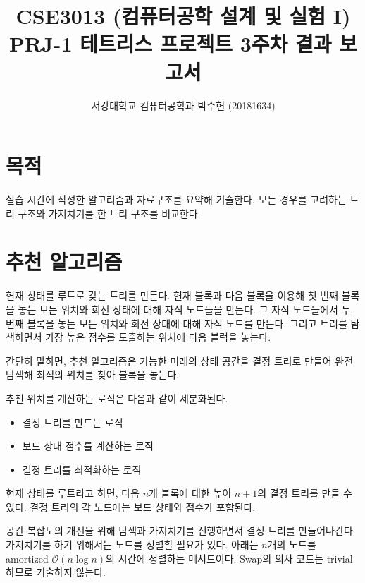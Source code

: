 
    
\usepackage{subfig}
\usepackage{pgfplots}



\title{CSE3013 (컴퓨터공학 설계 및 실험 I) \space \newline PRJ-1 테트리스 프로젝트 3주차 결과 보고서}
\author{서강대학교 컴퓨터공학과 박수현 (20181634)}
\maketitle

\section{목적}
실습 시간에 작성한 알고리즘과 자료구조를 요약해 기술한다. 모든 경우를 고려하는 트리 구조와 가지치기를 한 트리 구조를 비교한다.

\section{추천 알고리즘}
현재 상태를 루트로 갖는 트리를 만든다. 현재 블록과 다음 블록을 이용해 첫 번째 블록을 놓는 모든 위치와 회전 상태에 대해 자식 노드들을 만든다.
그 자식 노드들에서 두 번째 블록을 놓는 모든 위치와 회전 상태에 대해 자식 노드를 만든다.
그리고 트리를 탐색하면서 가장 높은 점수를 도출하는 위치에 다음 블럭을 놓는다.

간단히 말하면, 추천 알고리즘은 가능한 미래의 상태 공간을 결정 트리로 만들어 완전 탐색해 최적의
위치를 찾아 블록을 놓는다.

추천 위치를 계산하는 로직은 다음과 같이 세분화된다.
\begin{itemize}
    \item 결정 트리를 만드는 로직
    \item 보드 상태 점수를 계산하는 로직
    \item 결정 트리를 최적화하는 로직
\end{itemize}

현재 상태를 루트라고 하면, 다음 $n$개 블록에 대한 높이 $n+1$의 결정 트리를 만들 수 있다. 결정 트리의 각 노드에는
보드 상태와 점수가 포함된다.

공간 복잡도의 개선을 위해 탐색과 가지치기를 진행하면서 결정 트리를 만들어나간다. 가지치기를 하기 위해서는
노드를 정렬할 필요가 있다. 아래는 $n$개의 노드를 amortized $\mathcal{O}\left(n \log n\right)$의
시간에 정렬하는 메서드이다. Swap의 의사 코드는 trivial하므로 기술하지 않는다.

